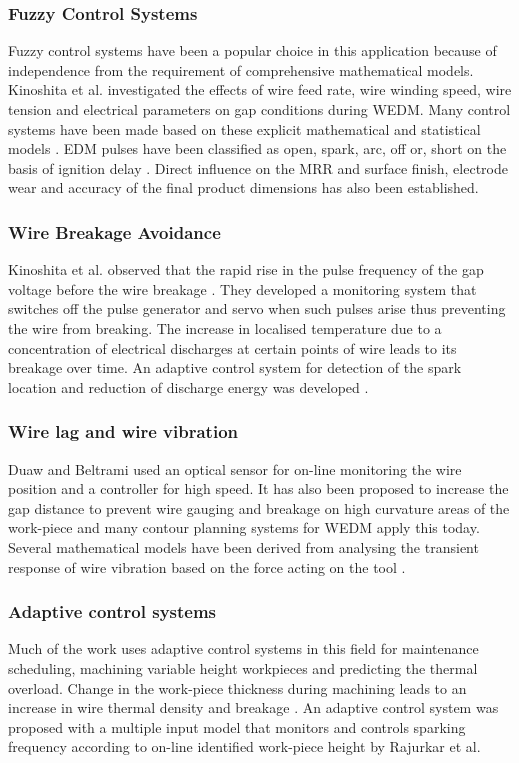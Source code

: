 \documentclass[a4paper]{IEEEtran}
\begin{document}
\subsubsection{Fuzzy Control Systems}
	Fuzzy control systems have been a popular choice in this application because of independence from the requirement of comprehensive mathematical models. Kinoshita et al. investigated the effects of wire feed rate, wire winding speed, wire tension and electrical parameters on gap conditions during WEDM. Many control systems have been made based on these explicit mathematical and statistical models \cite{kinoshita1976study}. EDM pulses have been classified as open, spark, arc, off or, short on the basis of ignition delay \cite{de1982has}. Direct influence on the MRR and surface finish, electrode wear and accuracy of the final product dimensions has also been established.

\subsubsection{Wire Breakage Avoidance}
	Kinoshita et al. observed that the rapid rise in the pulse frequency of the gap voltage before the wire breakage \cite{kinoshita1982control}. They developed a monitoring system that switches off the pulse generator and servo when such pulses arise thus preventing the wire from breaking. The increase in localised temperature due to a concentration of electrical discharges at certain points of wire leads to its breakage over time. An adaptive control system for detection of the spark location and reduction of discharge energy was developed \cite{kunieda1990line}.

\subsubsection{Wire lag and wire vibration}
	Duaw and Beltrami \cite{dauw1994high} used an optical sensor for on-line monitoring the wire position and a controller for high speed. It has also been proposed to increase the gap distance to prevent wire gauging and breakage on high curvature areas of the work-piece \cite{wang2003computer} and many contour planning systems for WEDM apply this today. Several mathematical models have been derived from analysing the transient response of wire vibration based on the force acting on the tool \cite{mohri1998system}.

\subsubsection{Adaptive control systems}
	Much of the work uses adaptive control systems in this field for maintenance scheduling, machining variable height workpieces and predicting the thermal overload. Change in the work-piece thickness during machining leads to an increase in wire thermal density and breakage \cite{kinoshita1982control}. An adaptive control system was proposed with a multiple input model that monitors and controls sparking frequency according to on-line identified work-piece height by Rajurkar et al. \cite{rajurkar1997wedm}
\end{document}
